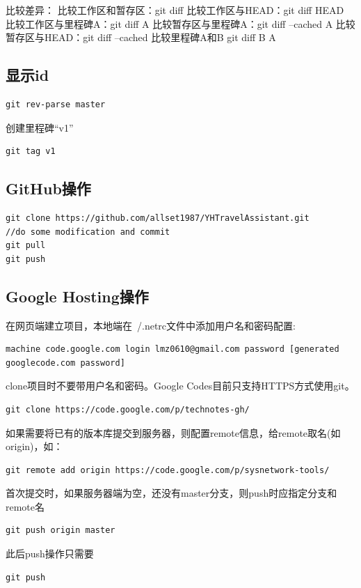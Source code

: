 比较差异：
比较工作区和暂存区：git diff
比较工作区与HEAD：git diff HEAD
比较工作区与里程碑A：git diff A
比较暂存区与里程碑A：git diff --cached A
比较暂存区与HEAD：git diff --cached
比较里程碑A和B git diff B A

\subsection{显示id}
\begin{verbatim}
git rev-parse master
\end{verbatim}

创建里程碑``v1''
\begin{verbatim}
git tag v1
\end{verbatim}

\subsection{GitHub操作}
\begin{verbatim}
git clone https://github.com/allset1987/YHTravelAssistant.git
//do some modification and commit
git pull
git push
\end{verbatim}

\subsection{Google Hosting操作}
在网页端建立项目，本地端在~/.netrc文件中添加用户名和密码配置:
\begin{verbatim}
machine code.google.com login lmz0610@gmail.com password [generated googlecode.com password] 
\end{verbatim}

clone项目时不要带用户名和密码。Google Codes目前只支持HTTPS方式使用git。
\begin{verbatim}
git clone https://code.google.com/p/technotes-gh/
\end{verbatim}

如果需要将已有的版本库提交到服务器，则配置remote信息，给remote取名(如origin)，如：
\begin{verbatim}
git remote add origin https://code.google.com/p/sysnetwork-tools/
\end{verbatim}

首次提交时，如果服务器端为空，还没有master分支，则push时应指定分支和remote名
\begin{verbatim}
git push origin master 
\end{verbatim}
此后push操作只需要
\begin{verbatim}
git push
\end{verbatim}

